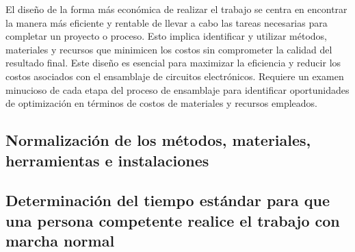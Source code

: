    El diseño de la forma más económica de realizar el trabajo se centra en encontrar la manera más eficiente y rentable de llevar a cabo las tareas necesarias para completar un proyecto o proceso. Esto implica identificar y utilizar métodos, materiales y recursos que minimicen los costos sin comprometer la calidad del resultado final. Este diseño es esencial para maximizar la eficiencia y reducir los costos asociados con el ensamblaje de circuitos electrónicos. Requiere un examen minucioso de cada etapa del proceso de ensamblaje para identificar oportunidades de optimización en términos de costos de materiales y recursos empleados.
    \subsection{Normalización de los métodos, materiales, herramientas e instalaciones}
    
    \subsection{Determinación del tiempo estándar para que una persona competente realice el trabajo con marcha normal}
    
    
    
    
    
